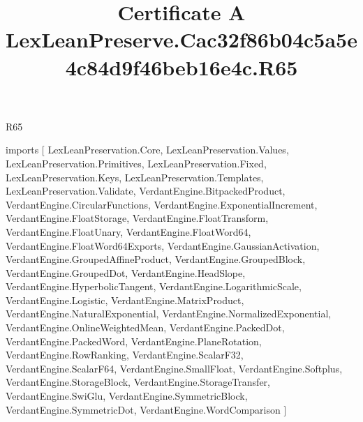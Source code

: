 \begin{lexlean}{R65}
\title{Certificate A LexLeanPreserve.Cac32f86b04c5a5e4c84d9f46beb16e4c.R65}
\begin{coremodule}
imports [
  LexLeanPreservation.Core,
  LexLeanPreservation.Values,
  LexLeanPreservation.Primitives,
  LexLeanPreservation.Fixed,
  LexLeanPreservation.Keys,
  LexLeanPreservation.Templates,
  LexLeanPreservation.Validate,
  VerdantEngine.BitpackedProduct,
  VerdantEngine.CircularFunctions,
  VerdantEngine.ExponentialIncrement,
  VerdantEngine.FloatStorage,
  VerdantEngine.FloatTransform,
  VerdantEngine.FloatUnary,
  VerdantEngine.FloatWord64,
  VerdantEngine.FloatWord64Exports,
  VerdantEngine.GaussianActivation,
  VerdantEngine.GroupedAffineProduct,
  VerdantEngine.GroupedBlock,
  VerdantEngine.GroupedDot,
  VerdantEngine.HeadSlope,
  VerdantEngine.HyperbolicTangent,
  VerdantEngine.LogarithmicScale,
  VerdantEngine.Logistic,
  VerdantEngine.MatrixProduct,
  VerdantEngine.NaturalExponential,
  VerdantEngine.NormalizedExponential,
  VerdantEngine.OnlineWeightedMean,
  VerdantEngine.PackedDot,
  VerdantEngine.PackedWord,
  VerdantEngine.PlaneRotation,
  VerdantEngine.RowRanking,
  VerdantEngine.ScalarF32,
  VerdantEngine.ScalarF64,
  VerdantEngine.SmallFloat,
  VerdantEngine.Softplus,
  VerdantEngine.StorageBlock,
  VerdantEngine.StorageTransfer,
  VerdantEngine.SwiGlu,
  VerdantEngine.SymmetricBlock,
  VerdantEngine.SymmetricDot,
  VerdantEngine.WordComparison
]


\end{coremodule}
\end{lexlean}

